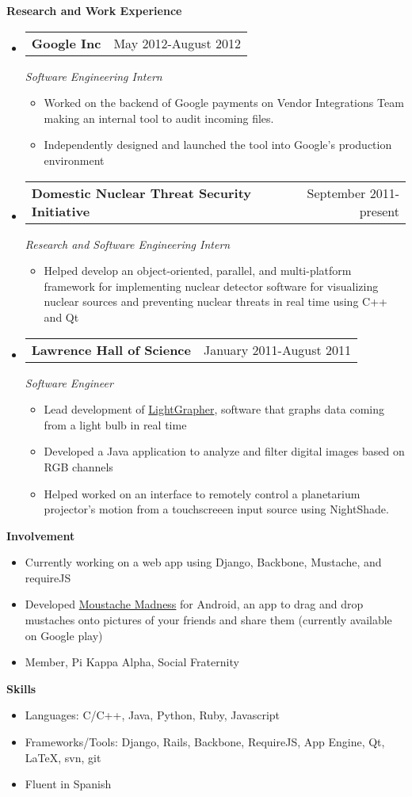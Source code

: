 \documentclass[letterpaper,11pt]{article}
\makeatletter
\newcommand{\resitem}[1]{\item #1 \vspace{-2pt}}
\newcommand{\desitem}[1]{\item #1 \vspace{-7pt}}
\newcommand{\resheading}[1]{{\large \colorbox{mygrey}{\begin{minipage}{\textwidth}{\textbf{#1 \vphantom{p\^{E}}}}\end{minipage}}}}
\newcommand{\expsubheading}[3]{
\begin{tabular*}{7.0in}{l@{\extracolsep{\fill}}r}
		\textbf{#1} & #2 \\
\end{tabular*}
\emph{#3}
\vspace{-6pt}
}
\makeatother
\begin{document}
\resheading{Research and Work Experience}
\begin{itemize}
\item
     \expsubheading{Google Inc}{May 2012-August 2012}{Software Engineering Intern}
     \begin{itemize}
         \resitem{Worked on the backend of Google payments on Vendor Integrations Team making an internal tool to audit incoming files.}
		 \resitem{Independently designed and launched the tool into Google's  production environment}
     \end{itemize}
     
\item
     \expsubheading{Domestic Nuclear Threat Security Initiative}{September 2011-present}{Research and Software Engineering Intern}
     \begin{itemize}
         \resitem{Helped develop an object-oriented, parallel, and multi-platform framework for implementing nuclear detector software for visualizing nuclear sources and preventing nuclear threats in real time using C++ and Qt}
     \end{itemize}
\item
   \expsubheading{Lawrence Hall of Science}{January 2011-August 2011}{Software Engineer}
    \begin{itemize}
         \resitem{Lead development of \hyperref{http://kepler.nasa.gov/education/ModelsandSimulations/lightgrapher/}{}{}{LightGrapher}, software that graphs data coming from a light bulb in real time}
         \resitem{Developed a Java application to analyze and filter digital images based on RGB channels}
         \resitem{Helped worked on an interface to remotely control a planetarium projector's motion from a touchscreeen input source using NightShade.}
         
     \end{itemize}	
\end{itemize}

\resheading{Involvement}
\begin{itemize}
	\desitem{Currently working on a web app using Django, Backbone, Mustache, and requireJS}
    \desitem{Developed \hyperref{https://play.google.com/store/apps/details?id=com.owleyes.moustache}{}{}{Moustache Madness} for Android, an app to drag and drop mustaches onto pictures of your friends and share them (currently available on Google play)}
    \desitem{Member,
    Pi Kappa Alpha, Social Fraternity}
\end{itemize}

\vspace{0.1in}

\resheading{Skills}
\begin{itemize}
    \desitem{Languages:
                    C/C++, Java, Python, Ruby, Javascript}
	\desitem{Frameworks/Tools: Django, Rails, Backbone, RequireJS, App Engine, Qt, LaTeX, svn, git}
    \desitem{Fluent in Spanish}
\end{itemize}
\end{document}
